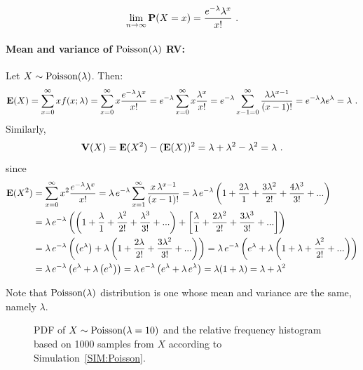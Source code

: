\[
\lim_{n \to \infty} \mathbf{P}(X=x)
= \frac{ e^{-\lambda} \lambda^x}{x!}  \ .
\]

\paragraph{Mean and variance of $\mbox{{\rm Poisson}}(\lambda)$ RV:}
Let $X \sim \mbox{{\rm Poisson}}(\lambda)$.  Then:
\[
\mathbf{E}(X) = \sum_{x=0}^{\infty} x f(x;\lambda)
= \sum_{x =0}^{\infty} x \frac{ e^{-\lambda} \lambda^x}{x!}
= e^{-\lambda} \sum_{x =0}^{\infty} x \frac{  \lambda^x}{x!}
= e^{-\lambda} \sum_{x -1 =0}^{\infty} \frac{ \lambda \lambda^{x-1}}{(x-1)!}
= e^{-\lambda} \lambda e^{\lambda}
= \lambda
\ .
\]
Similarly,
\[
\V(X) = \e(X^2)-(\e(X))^2 = \lambda + \lambda^2 - \lambda^2 = \lambda \ .
\]
since
\begin{align*}
\mathbf{E}(X^2)& = \sum_{x=0}^{\infty} x^2 \frac{e^{-\lambda} \lambda^x}{x!} = \lambda \, e^{-\lambda} \sum_{x=1}^{\infty} \frac{x \, \lambda^{x-1}}{(x-1)!}
= \lambda \, e^{-\lambda} \left( 1 + \frac{2 \lambda}{1} + \frac{3 \lambda^2}{2!} + \frac{4 \lambda^3}{3!} + ... \right)\\
&= \lambda \, e^{-\lambda} \left( \left( 1 + \frac{\lambda}{1} + \frac{\lambda^2}{2!} + \frac{\lambda^3}{3!} + ... \right) + \left[ \frac{\lambda}{1} + \frac{2 \lambda^2}{2!} + \frac{3 \lambda^3}{3!} + ... \right] \right)\\
&= \lambda \, e^{-\lambda} \left( \left( e^{\lambda} \right) + \lambda \left( 1 + \frac{2 \lambda}{2!} + \frac{3 \lambda^2}{3!} + ... \right) \right)
= \lambda \, e^{-\lambda} \left( e^{\lambda} + \lambda \left( 1 + \lambda + \frac{\lambda^2}{2!} + ... \right) \right)\\
&= \lambda \, e^{-\lambda} \left( e^{\lambda} + \lambda \left( e^{\lambda} \right) \right)
= \lambda \, e^{-\lambda} \left( e^{\lambda} + \lambda\, e^{\lambda}\right) = \lambda (1 + \lambda) = \lambda + \lambda^2
\end{align*}

Note that $\mbox{{\rm Poisson}}(\lambda)$ distribution is one whose mean and variance are the same, namely $\lambda$.

\begin{figure}[htpb]
\caption{PDF of $X \sim \mbox{{\rm Poisson}}(\lambda=10)$ and the relative frequency histogram based on 1000 samples from $X$ according to Simulation~\ref{SIM:Poisson}.\label{F:PlotPdfSim1000HistPoiss10}}
\centering   {}
\end{figure}

